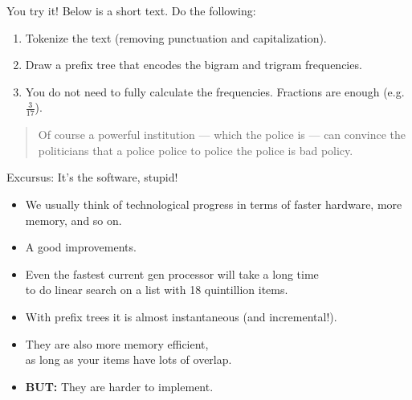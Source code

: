 \documentclass[professionalfonts, xcolor={usenames,svgnames,x11names,table}]{beamer}
\begin{document}
\begin{frame}{You try it!}
    Below is a short text.
    Do the following:
    \begin{enumerate}
        \item Tokenize the text (removing punctuation and capitalization).
        \item Draw a prefix tree that encodes the bigram and trigram frequencies.
        \item You do not need to fully calculate the frequencies.
              Fractions are enough (e.g. $\frac{3}{17}$).
    \end{enumerate}

    \begin{quote}
        Of course a powerful institution --- which the police is ---
        can convince the politicians that a police police to police the police is bad policy.
    \end{quote}

\end{frame}

\begin{frame}{Excursus: It's the software, stupid!}
    \begin{itemize}
        \item We usually think of technological progress in terms of faster hardware, more memory, and so on.
        \item A good  improvements.
    \end{itemize}

    \begin{example}
        \begin{itemize}
            \item Even the fastest current gen processor will take a long time\\
                to do linear search on a list with 18 quintillion items.
            \item With prefix trees it is almost instantaneous (and incremental!).
            \item They are also more memory efficient,\\
                  as long as your items have lots of overlap.
            \item \textbf{BUT:} They are harder to implement.
        \end{itemize}
    \end{example}
\end{frame}
\end{document}
